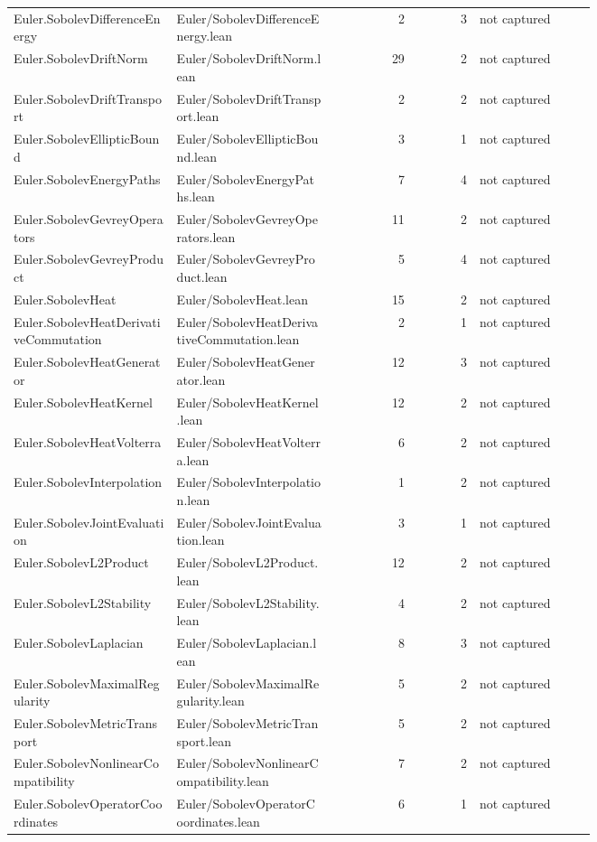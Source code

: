 \documentclass[10pt]{article}
\begin{document}
\begin{longtable}{p{0.28\linewidth}p{0.27\linewidth}r r p{0.20\linewidth}}
Euler.SobolevDifferenceEnergy & Euler/SobolevDifferenceEnergy.lean & 2 & 3 & not captured\\
Euler.SobolevDriftNorm & Euler/SobolevDriftNorm.lean & 29 & 2 & not captured\\
Euler.SobolevDriftTransport & Euler/SobolevDriftTransport.lean & 2 & 2 & not captured\\
Euler.SobolevEllipticBound & Euler/SobolevEllipticBound.lean & 3 & 1 & not captured\\
Euler.SobolevEnergyPaths & Euler/SobolevEnergyPaths.lean & 7 & 4 & not captured\\
Euler.SobolevGevreyOperators & Euler/SobolevGevreyOperators.lean & 11 & 2 & not captured\\
Euler.SobolevGevreyProduct & Euler/SobolevGevreyProduct.lean & 5 & 4 & not captured\\
Euler.SobolevHeat & Euler/SobolevHeat.lean & 15 & 2 & not captured\\
Euler.SobolevHeatDerivativeCommutation & Euler/SobolevHeatDerivativeCommutation.lean & 2 & 1 & not captured\\
Euler.SobolevHeatGenerator & Euler/SobolevHeatGenerator.lean & 12 & 3 & not captured\\
Euler.SobolevHeatKernel & Euler/SobolevHeatKernel.lean & 12 & 2 & not captured\\
Euler.SobolevHeatVolterra & Euler/SobolevHeatVolterra.lean & 6 & 2 & not captured\\
Euler.SobolevInterpolation & Euler/SobolevInterpolation.lean & 1 & 2 & not captured\\
Euler.SobolevJointEvaluation & Euler/SobolevJointEvaluation.lean & 3 & 1 & not captured\\
Euler.SobolevL2Product & Euler/SobolevL2Product.lean & 12 & 2 & not captured\\
Euler.SobolevL2Stability & Euler/SobolevL2Stability.lean & 4 & 2 & not captured\\
Euler.SobolevLaplacian & Euler/SobolevLaplacian.lean & 8 & 3 & not captured\\
Euler.SobolevMaximalRegularity & Euler/SobolevMaximalRegularity.lean & 5 & 2 & not captured\\
Euler.SobolevMetricTransport & Euler/SobolevMetricTransport.lean & 5 & 2 & not captured\\
Euler.SobolevNonlinearCompatibility & Euler/SobolevNonlinearCompatibility.lean & 7 & 2 & not captured\\
Euler.SobolevOperatorCoordinates & Euler/SobolevOperatorCoordinates.lean & 6 & 1 & not captured\\

\end{longtable}
\end{document}
